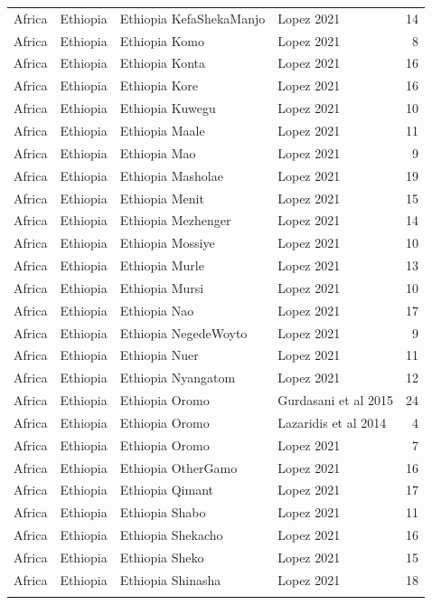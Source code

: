 \begin{longtable}[t]{lll>{\raggedright\arraybackslash}p{9em}r}
Africa & Ethiopia & Ethiopia KefaShekaManjo & Lopez 2021 & 14\\
\addlinespace
Africa & Ethiopia & Ethiopia Komo & Lopez 2021 & 8\\
Africa & Ethiopia & Ethiopia Konta & Lopez 2021 & 16\\
Africa & Ethiopia & Ethiopia Kore & Lopez 2021 & 16\\
Africa & Ethiopia & Ethiopia Kuwegu & Lopez 2021 & 10\\
Africa & Ethiopia & Ethiopia Maale & Lopez 2021 & 11\\
\addlinespace
Africa & Ethiopia & Ethiopia Mao & Lopez 2021 & 9\\
Africa & Ethiopia & Ethiopia Masholae & Lopez 2021 & 19\\
Africa & Ethiopia & Ethiopia Menit & Lopez 2021 & 15\\
Africa & Ethiopia & Ethiopia Mezhenger & Lopez 2021 & 14\\
Africa & Ethiopia & Ethiopia Mossiye & Lopez 2021 & 10\\
\addlinespace
Africa & Ethiopia & Ethiopia Murle & Lopez 2021 & 13\\
Africa & Ethiopia & Ethiopia Mursi & Lopez 2021 & 10\\
Africa & Ethiopia & Ethiopia Nao & Lopez 2021 & 17\\
Africa & Ethiopia & Ethiopia NegedeWoyto & Lopez 2021 & 9\\
Africa & Ethiopia & Ethiopia Nuer & Lopez 2021 & 11\\
\addlinespace
Africa & Ethiopia & Ethiopia Nyangatom & Lopez 2021 & 12\\
Africa & Ethiopia & Ethiopia Oromo & Gurdasani et al 2015 & 24\\
Africa & Ethiopia & Ethiopia Oromo & Lazaridis et al 2014 & 4\\
Africa & Ethiopia & Ethiopia Oromo & Lopez 2021 & 7\\
Africa & Ethiopia & Ethiopia OtherGamo & Lopez 2021 & 16\\
\addlinespace
Africa & Ethiopia & Ethiopia Qimant & Lopez 2021 & 17\\
Africa & Ethiopia & Ethiopia Shabo & Lopez 2021 & 11\\
Africa & Ethiopia & Ethiopia Shekacho & Lopez 2021 & 16\\
Africa & Ethiopia & Ethiopia Sheko & Lopez 2021 & 15\\
Africa & Ethiopia & Ethiopia Shinasha & Lopez 2021 & 18\\
\addlinespace

\end{longtable}
